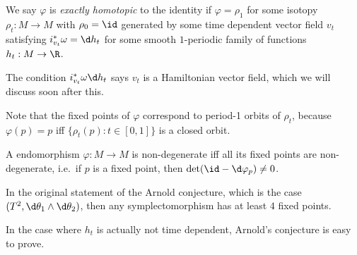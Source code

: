 \documentclass[a4paper]{article}
\begin{document}
\begin{defi}
  We say $\varphi$ is \emph{exactly homotopic} to the identity if $\varphi = \rho_1$ for some isotopy $\rho_t: M \to M$ with $\rho_0 = \id$ generated by some time dependent vector field $v_t$ satisfying $i_{v_t}^* \omega = \d h_t$ for some smooth $1$-periodic family of functions $h_t: M \to \R$.
\end{defi}
The condition $i_{v_t}^* \omega \d h_t$ says $v_t$ is a Hamiltonian vector field, which we will discuss soon after this.

Note that the fixed points of $\varphi$ correspond to period-1 orbits of $\rho_t$, because $\varphi(p) = p$ iff $\{\rho_t(p) : t \in [0, 1]\}$ is a closed orbit.

\begin{defi}
  A endomorphism $\varphi: M \to M$ is non-degenerate iff all its fixed points are non-degenerate, i.e.\ if $p$ is a fixed point, then $\det (\id - \d \varphi_p) \not= 0$.
\end{defi}
\begin{eg}
  In the original statement of the Arnold conjecture, which is the case $(T^2, \d \theta_1 \wedge \d \theta_2)$, then any symplectomorphism has at least $4$ fixed points.
\end{eg}

In the case where $h_t$ is actually not time dependent, Arnold's conjecture is easy to prove.

\printindex
\end{document}
